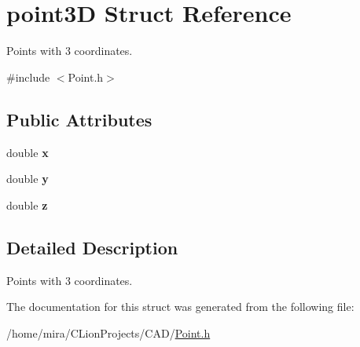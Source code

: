 \hypertarget{structpoint3D}{}\section{point3D Struct Reference}
\label{structpoint3D}


Points with 3 coordinates.  




{\ttfamily \#include $<$Point.\+h$>$}

\subsection*{Public Attributes}
\begin{DoxyCompactItemize}
\item 
double {\bfseries x}\hypertarget{structpoint3D_a931445a1beefab42e54ff84f200f53f3}{}\label{structpoint3D_a931445a1beefab42e54ff84f200f53f3}

\item 
double {\bfseries y}\hypertarget{structpoint3D_a78e4b9b1c38c7bec231e428f5c638153}{}\label{structpoint3D_a78e4b9b1c38c7bec231e428f5c638153}

\item 
double {\bfseries z}\hypertarget{structpoint3D_ae7370c9a05b6fb32d54c2b37a8b87d91}{}\label{structpoint3D_ae7370c9a05b6fb32d54c2b37a8b87d91}

\end{DoxyCompactItemize}


\subsection{Detailed Description}
Points with 3 coordinates. 

The documentation for this struct was generated from the following file\+:\begin{DoxyCompactItemize}
\item 
/home/mira/\+C\+Lion\+Projects/\+C\+A\+D/\hyperlink{Point_8h}{Point.\+h}\end{DoxyCompactItemize}
